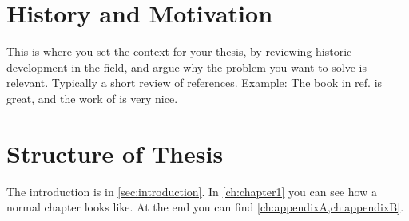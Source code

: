 
\label{sec:introduction}


\section{History and Motivation}

This is where you set the context for your thesis, by reviewing historic development in the field, and argue why the problem you want to solve is relevant.
Typically a short review of references. Example: The book in ref. \cite{altland2010condensed} is great, and the work of \cite{Thouless1982,Tomonaga1950} is very nice.

\section{Structure of Thesis}

The introduction is in \cref{sec:introduction}. In \cref{ch:chapter1} you can see how a normal chapter looks like.
At the end you can find \cref{ch:appendixA,ch:appendixB}.